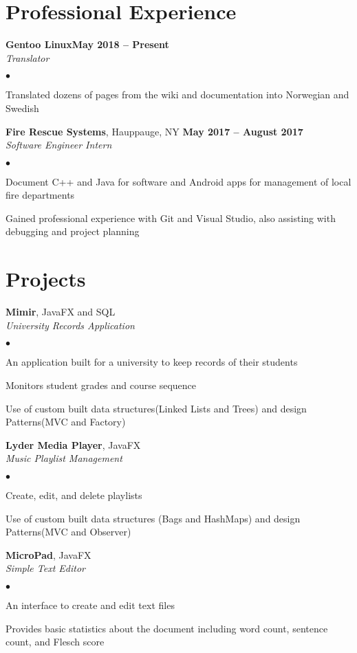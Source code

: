 \documentclass[margin,line]{res}
\newenvironment{list2}{
  \begin{list}{$\bullet$}{
      \setlength{\itemsep}{0in}
      \setlength{\parsep}{0in} \setlength{\parskip}{0in}
      \setlength{\topsep}{0in} \setlength{\partopsep}{0in}
      \setlength{\leftmargin}{0.2in}}}{\end{list}}
\begin{document}
\begin{resume}
\section{\sc Professional Experience}
{\bf Gentoo Linux}\hfill {\bf May 2018 -- Present}\\
{\em Translator}
\begin{list2} %
\item Translated dozens of pages from the wiki and documentation into Norwegian and Swedish
\end{list2}
{\bf Fire Rescue Systems}, Hauppauge, NY \hfill {\bf May 2017 -- August 2017}\\
{\em Software Engineer Intern}
\begin{list2} %
\item Document C++ and Java for software and Android apps for management of local fire departments
\item Gained professional experience with Git and Visual Studio, also assisting with debugging and project planning
\end{list2}

\section{\sc Projects}
{\bf Mimir}, JavaFX and SQL\\
{\em University Records Application}
\begin{list2}
\item An application built for a university to keep records of their students
\item Monitors student grades and course sequence
\item Use of custom built data structures(Linked Lists and Trees) and design Patterns(MVC and Factory)
\end{list2}
{\bf Lyder Media Player}, JavaFX\\
{\em Music Playlist Management}
\begin{list2}
\item Create, edit, and delete playlists
\item Use of custom built data structures (Bags and HashMaps) and design Patterns(MVC and Observer)
\end{list2}
{\bf MicroPad}, JavaFX\\
{\em Simple Text Editor}
\begin{list2}
\item An interface to create and edit text files
\item Provides basic statistics about the document including word count, sentence count, and Flesch score
\end{list2}

\end{resume}
\end{document}

